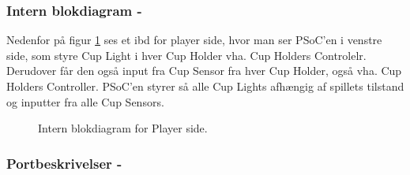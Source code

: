 \documentclass[Arkitektur/System_main.tex]{subfiles}
\begin{document}
\subsubsection{Intern blokdiagram - }

Nedenfor på figur \ref{fig:playerside_hardware_ibd} ses et ibd for player side, hvor man ser PSoC'en i venstre side, som styre Cup Light i hver Cup Holder vha. Cup Holders Controlelr. Derudover får den også input fra Cup Sensor fra hver Cup Holder, også vha. Cup Holders Controller. PSoC'en styrer så alle Cup Lights afhængig af spillets tilstand og inputter fra alle Cup Sensors. 

\begin{figure}[H]
    \centering
    \caption{Intern blokdiagram for Player side.}
    \label{fig:playerside_hardware_ibd}
\end{figure}

\subsubsection{Portbeskrivelser - }
\end{document}
